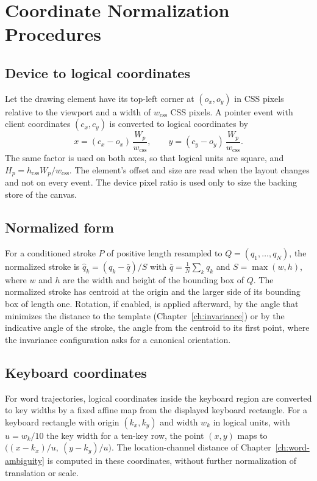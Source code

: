 \chapter{Coordinate Normalization Procedures}\label{app:coordinates}

\section{Device to logical coordinates}

Let the drawing element have its top-left corner at $(o_x,o_y)$ in CSS pixels relative to the viewport and a width of $w_{\mathrm{css}}$ CSS pixels. A pointer event with client coordinates $(c_x,c_y)$ is converted to logical coordinates by
\[
x=(c_x-o_x)\,\frac{W_p}{w_{\mathrm{css}}},\qquad y=(c_y-o_y)\,\frac{W_p}{w_{\mathrm{css}}}.
\]
The same factor is used on both axes, so that logical units are square, and $H_p=h_{\mathrm{css}}W_p/w_{\mathrm{css}}$. The element's offset and size are read when the layout changes and not on every event. The device pixel ratio is used only to size the backing store of the canvas.

\section{Normalized form}

For a conditioned stroke $P$ of positive length resampled to $Q=(q_1,\dots,q_N)$, the normalized stroke is $\hat q_k=(q_k-\bar q)/S$ with $\bar q=\tfrac1N\sum_kq_k$ and $S=\max(w,h)$, where $w$ and $h$ are the width and height of the bounding box of $Q$. The normalized stroke has centroid at the origin and the larger side of its bounding box of length one. Rotation, if enabled, is applied afterward, by the angle that minimizes the distance to the template (Chapter~\ref{ch:invariance}) or by the indicative angle of the stroke, the angle from the centroid to its first point, where the invariance configuration asks for a canonical orientation.

\section{Keyboard coordinates}

For word trajectories, logical coordinates inside the keyboard region are converted to key widths by a fixed affine map from the displayed keyboard rectangle. For a keyboard rectangle with origin $(k_x,k_y)$ and width $w_k$ in logical units, with $u=w_k/10$ the key width for a ten-key row, the point $(x,y)$ maps to $\bigl((x-k_x)/u,\ (y-k_y)/u\bigr)$. The location-channel distance of Chapter~\ref{ch:word-ambiguity} is computed in these coordinates, without further normalization of translation or scale.


